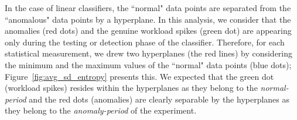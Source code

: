 In the case of linear classifiers, the ``normal" data points are separated from the ``anomalous" data points by a hyperplane. 
In this analysis, we consider that the anomalies (red dots) and the genuine workload spikes (green dot) are appearing only during the testing or detection phase of the classifier. Therefore, for each statistical measurement, we drew two hyperplanes (the red lines) by considering the minimum and the maximum values of the ``normal" data points (blue dots); Figure~\ref{fig:avg_sd_entropy} presents this. We expected that the green dot (workload spikes) resides within the hyperplanes as they belong to the \textit{normal-period} and the red dots (anomalies) are clearly separable by the hyperplanes as they belong to the \textit{anomaly-period} of the experiment. 
